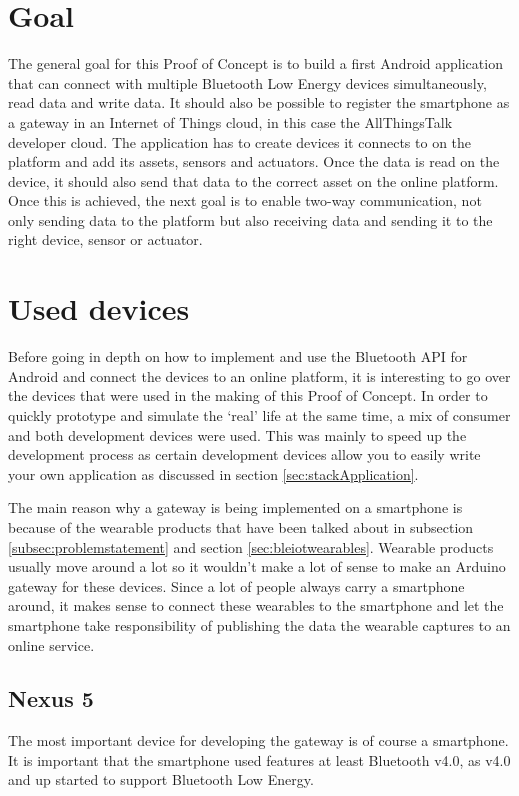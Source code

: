 \documentclass[pdftex,a4paper,12pt,twoside]{report}
\begin{document}
\newpage{}

\section{Goal}
\label{sec:pocgoal}
The general goal for this Proof of Concept is to build a first Android application that can connect with multiple Bluetooth Low Energy devices simultaneously, read data and write data. It should also be possible to register the smartphone as a gateway in an Internet of Things cloud, in this case the AllThingsTalk developer cloud. The application has to create devices it connects to on the platform and add its assets, sensors and actuators. Once the data is read on the device, it should also send that data to the correct asset on the online platform. Once this is achieved, the next goal is to enable two-way communication, not only sending data to the platform but also receiving data and sending it to the right device, sensor or actuator.

\section{Used devices}
\label{sec:devices}
Before going in depth on how to implement and use the Bluetooth API for Android and connect the devices to an online platform, it is interesting to go over the devices that were used in the making of this Proof of Concept. In order to quickly prototype and simulate the `real' life at the same time, a mix of consumer and both development devices were used. This was mainly to speed up the development process as certain development devices allow you to easily write your own application as discussed in section \ref{sec:stackApplication}.

The main reason why a gateway is being implemented on a smartphone is because of the wearable products that have been talked about in subsection \ref{subsec:problemstatement} and section \ref{sec:bleiotwearables}. Wearable products usually move around a lot so it wouldn't make a lot of sense to make an Arduino gateway for these devices. Since a lot of people always carry a smartphone around, it makes sense to connect these wearables to the smartphone and let the smartphone take responsibility of publishing the data the wearable captures to an online service.

\subsection{Nexus 5}
\label{subsec:nexus}
The most important device for developing the gateway is of course a smartphone. It is important that the smartphone used features at least Bluetooth v4.0, as v4.0 and up started to support Bluetooth Low Energy.
\end{document}
